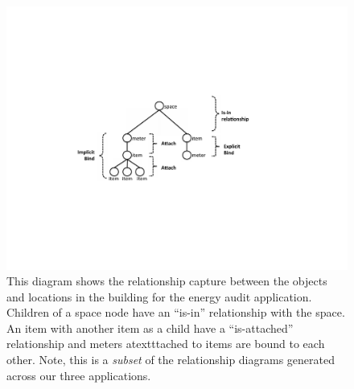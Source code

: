 \begin{figure}[htb!]
\begin{center}
\includegraphics[scale=0.55]{figs/bindattachstructs}
\caption{This diagram shows the relationship capture between the objects and locations in the building for the 
energy audit application.  Children of a space node have an ``is-in'' relationship with the space.  An item
with another item as a child have a ``is-attached'' relationship and meters atextttached to items are bound to each other.
Note, this is a \emph{subset} of the relationship diagrams generated across our three applications.}
\label{fig:atextttachandbind}
\end{center}
\end{figure}



